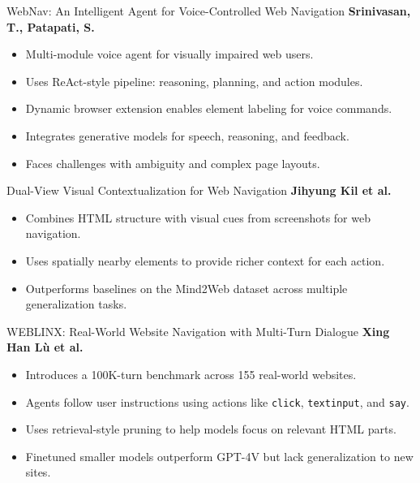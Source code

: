 \documentclass{beamer}
\begin{document}
\begin{frame}{WebNav: An Intelligent Agent for Voice-Controlled
 Web Navigation}
\large\textbf{Srinivasan, T., Patapati, S.}

\normalsize
\begin{itemize}
  \item Multi-module voice agent for visually impaired web users.
  \item Uses ReAct-style pipeline: reasoning, planning, and action modules.
  \item Dynamic browser extension enables element labeling for voice commands.
  \item Integrates generative models for speech, reasoning, and feedback.
  \item Faces challenges with ambiguity and complex page layouts.
\end{itemize}
\end{frame}







\begin{frame}{Dual-View Visual Contextualization for Web Navigation }
\large\textbf{Jihyung Kil et al.}

\normalsize
\begin{itemize}
  \item Combines HTML structure with visual cues from screenshots for web navigation.
  \item Uses spatially nearby elements to provide richer context for each action.
  \item Outperforms baselines on the Mind2Web dataset across multiple generalization tasks.
\end{itemize}
\end{frame}



\begin{frame}{WEBLINX: Real-World Website Navigation with Multi-Turn Dialogue}
\large\textbf{Xing Han L\`u et al.}

\normalsize
\begin{itemize}
  \item Introduces a 100K-turn benchmark across 155 real-world websites.
  \item Agents follow user instructions using actions like \texttt{click}, \texttt{textinput}, and \texttt{say}.
  \item Uses retrieval-style pruning to help models focus on relevant HTML parts.
  \item Finetuned smaller models outperform GPT-4V but lack generalization to new sites.
\end{itemize}
\end{frame}
\end{document}
